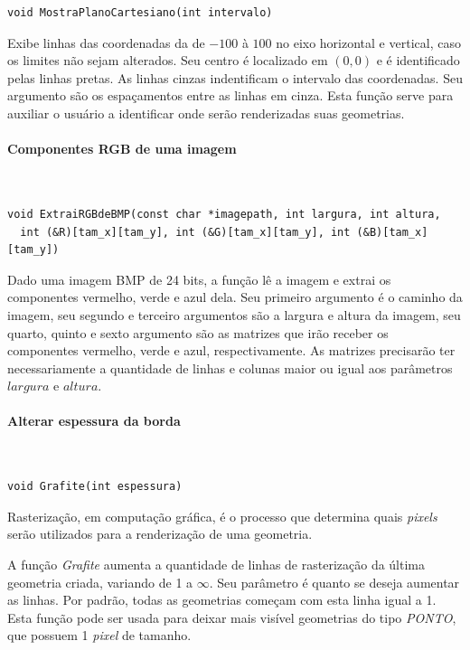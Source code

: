  \begin{lstlisting}
void MostraPlanoCartesiano(int intervalo)
\end{lstlisting}
Exibe linhas das coordenadas da \playAPC{} de $-100$ à $100$ no eixo horizontal e vertical, caso os limites não sejam alterados. Seu centro é localizado em $(0,0)$ e é identificado pelas linhas pretas. As linhas cinzas indentificam o intervalo das coordenadas. Seu argumento são os espaçamentos entre as linhas em cinza.
Esta função serve para auxiliar o usuário a identificar onde serão renderizadas suas geometrias.

 \paragraph{Componentes RGB de uma imagem}\mbox{}\\
  \begin{lstlisting}
void ExtraiRGBdeBMP(const char *imagepath, int largura, int altura, 
  int (&R)[tam_x][tam_y], int (&G)[tam_x][tam_y], int (&B)[tam_x][tam_y])
\end{lstlisting}
Dado uma imagem BMP de 24 bits, a função lê a imagem e extrai os componentes vermelho, verde e azul dela. Seu primeiro argumento é o caminho da imagem, seu segundo e terceiro argumentos são a largura e altura da imagem, seu quarto, quinto e sexto argumento são as matrizes que irão receber os componentes vermelho, verde e azul, respectivamente. As matrizes precisarão ter necessariamente a quantidade de linhas e colunas maior ou igual aos parâmetros $largura$ e $altura$.

\paragraph{Alterar espessura da borda}\mbox{}\\
 \begin{lstlisting}
void Grafite(int espessura)
\end{lstlisting}
Rasterização, em computação gráfica, é o processo que determina quais \emph{pixels} serão utilizados para a renderização de uma geometria.

A função \emph{Grafite} aumenta a quantidade de linhas de rasterização da última geometria criada, variando de 1 a $\infty$. Seu parâmetro é quanto se deseja aumentar as linhas. Por padrão, todas as geometrias começam com esta linha igual a 1. Esta função pode ser usada para deixar mais visível geometrias do tipo \emph{PONTO}, que possuem 1 \emph{pixel} de tamanho.


















